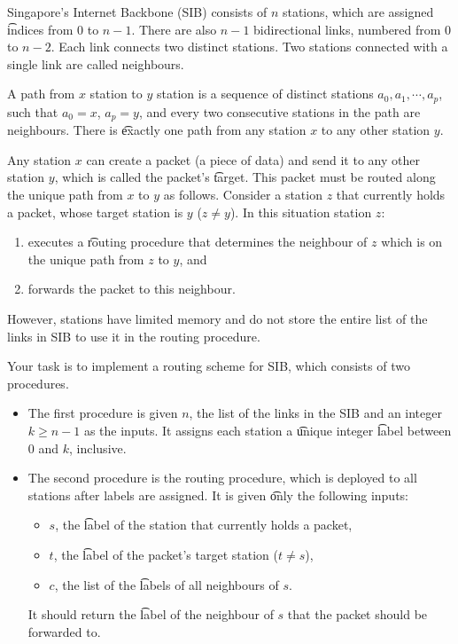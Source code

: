 Singapore's Internet Backbone (SIB) consists of $n$ stations, which are assigned \t{indices} from $0$ to $n-1$. There are also $n-1$ bidirectional links, numbered from $0$ to $n-2$. Each link connects two distinct stations. Two stations connected with a single link are called neighbours.

A path from $x$ station to $y$ station is a sequence of distinct stations $a_0,a_1,\cdots,a_p$, such that $a_0=x$, $a_p=y$, and every two consecutive stations in the path are neighbours. There is \t{exactly one} path from any station $x$ to any other station $y$.

Any station $x$ can create a packet (a piece of data) and send it to any other station $y$, which is called the packet's \t{target}. This packet must be routed along the unique path from $x$ to $y$ as follows. Consider a station $z$ that currently holds a packet, whose target station is $y$ ($z \neq y$). In this situation
station $z$:
\begin{enumerate}
\item executes a \t{routing procedure} that determines the neighbour of $z$ which is on the unique path from $z$ to $y$, and
\item forwards the packet to this neighbour.
\end{enumerate}

However, stations have limited memory and do not store the entire list of the links in SIB to use it in
the routing procedure.

Your task is to implement a routing scheme for SIB, which consists of two procedures.

\begin{itemize}
\item The first procedure is given $n$, the list of the links in the SIB and an integer $k \geq n-1$ as the inputs. It assigns each station a \t{unique} integer \t{label} between $0$ and $k$, inclusive.
\item The second procedure is the routing procedure, which is deployed to all stations after labels are assigned. It is given \t{only} the following inputs:
\begin{itemize}
\item $s$, the \t{label} of the station that currently holds a packet,
\item $t$, the \t{label} of the packet's target station ($t \neq s$),
\item $c$, the list of the \t{labels} of all neighbours of $s$.
\end{itemize}
It should return the \t{label} of the neighbour of $s$ that the packet should be forwarded to.

\end{itemize}

